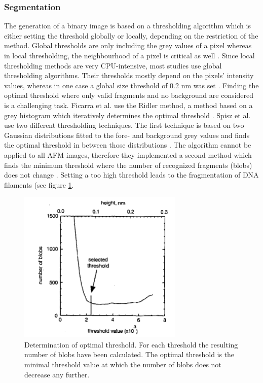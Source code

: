 \documentclass{article}
\begin{document}
\subsubsection{Segmentation}
The generation of a binary image is based on a thresholding algorithm which is either setting the threshold globally or locally, depending on the restriction of the method. Global thresholds are only including the grey values of a pixel whereas in local thresholding, the neighbourhood of a pixel is critical as well \cite{weszka1978survey}. Since local thresholding methods are very CPU-intensive, most studies use global thresholding algorithms. Their thresholds mostly depend on the pixels’ intensity values, whereas in one case a global size threshold of 0.2 nm was set \cite{sanchez2002accuracy}. Finding the optimal threshold where only valid fragments and no background are considered is a challenging task. Ficarra et al. use the Ridler method, a method based on a grey histogram which iteratively determines the optimal threshold \cite{ridler1978picture}. Spisz et al. use two different thresholding techniques. The first technique is based on two Gaussian distributions fitted to the fore- and background grey values and finds the optimal threshold in between those distributions \cite {gonzales1987wintz}. The algorithm cannot be applied to all AFM images, therefore they implemented a second method which finds the minimum threshold where the number of recognized fragments (blobs) does not change \cite{russ1992image}. Setting a too high threshold leads to the fragmentation of DNA filaments (see figure \ref{fig: blobs}.

\begin{figure}[htb]
\begin{center}
\includegraphics[width = 0.7\textwidth]{Segmentation_histo}
\end{center}
\caption{Determination of optimal threshold. For each threshold the resulting number of blobs have been calculated. The optimal threshold is the minimal threshold value at which the number of blobs does not decrease any further.\cite{russ1992image}}
\label{fig: blobs} %
\end{figure}
\end{document}
